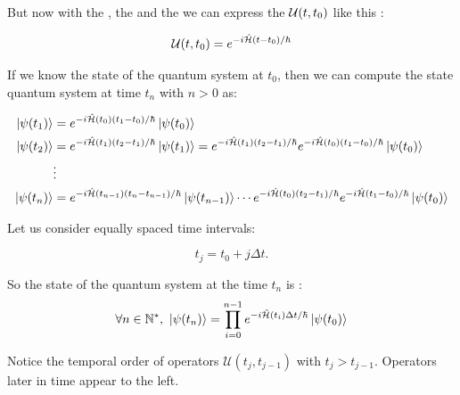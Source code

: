 But now with the , the  and the 
we can express the $\mathcal{U}(t,t_0)$ like this :

\begin{equation}
    \mathcal{U}(t,t_0) = e^{-i \hat{\mathcal{H}} (t-t_0)/\hbar}
\end{equation}



If we know the state of the quantum system at \( t_0 \), then we can compute the state quantum system at time \( t_n \) with $n > 0$ as:

\begin{align*}
    \ket{\psi(t_1)} &= e^{-i \hat{\mathcal{H}} (t_0) (t_1-t_0)/\hbar} \ket{\psi(t_0)} \\
    \ket{\psi(t_2)} &= e^{-i \hat{\mathcal{H}} (t_1) (t_2-t_1)/\hbar} \ket{\psi(t_1)} =  e^{-i \hat{\mathcal{H}}(t_1) (t_2-t_1)/\hbar} 
    e^{-i \hat{\mathcal{H}}(t_0) (t_1-t_0)/\hbar} \ket{\psi(t_0)}\\
    &\vdots \\
    \ket{\psi(t_n)} &= e^{-i \hat{\mathcal{H}}(t_{n-1}) (t_n-t_{n-1})/\hbar} \ket{\psi(t_{n-1})} \cdots  e^{-i \hat{\mathcal{H}}(t_{0}) (t_2-t_1)/\hbar} 
    e^{-i \hat{\mathcal{H}} (t_1-t_0)/\hbar} \ket{\psi(t_0)}
\end{align*}

Let us consider equally spaced time intervals:

\[
t_j = t_0 + j \Delta t.
\]

So the state of the quantum system at the time $t_n$ is  :
\begin{equation} \label{eq: expression state t_n}
   \forall n \in \mathbb{N}^*, \  \ket{\psi(t_n)} = \prod_{i=0}^{n-1} e^{-i \hat{\mathcal{H}}(t_{i}) \Delta t /\hbar} \ket{\psi(t_0)}
\end{equation}

Notice the temporal order of operators \( \mathcal{U}(t_j, t_{j-1}) \) with \( t_j > t_{j-1} \). Operators later in time appear to the left.

